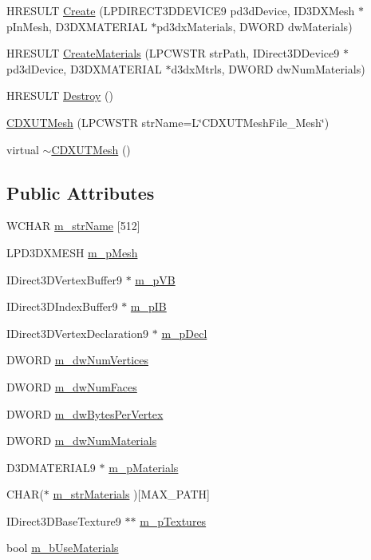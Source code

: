 \begin{DoxyCompactItemize}
\item 
HRESULT \hyperlink{class_c_d_x_u_t_mesh_ad7ffbc6b3d825dff6ca53ae0dbb2f6a1}{Create} (LPDIRECT3DDEVICE9 pd3dDevice, ID3DXMesh $\ast$pInMesh, D3DXMATERIAL $\ast$pd3dxMaterials, DWORD dwMaterials)
\item 
HRESULT \hyperlink{class_c_d_x_u_t_mesh_afe9dd1a0833b0d0b0df3fc0b72695e43}{CreateMaterials} (LPCWSTR strPath, IDirect3DDevice9 $\ast$pd3dDevice, D3DXMATERIAL $\ast$d3dxMtrls, DWORD dwNumMaterials)
\item 
HRESULT \hyperlink{class_c_d_x_u_t_mesh_ac19a8633a52a8075495c315e39c22c51}{Destroy} ()
\item 
\hyperlink{class_c_d_x_u_t_mesh_a4df4f33a650593f6e6898d21fa0d1a41}{CDXUTMesh} (LPCWSTR strName=L\char`\"{}CDXUTMeshFile\_\-Mesh\char`\"{})
\item 
virtual \hyperlink{class_c_d_x_u_t_mesh_abbf5790190a5b26f1ad7111884ef2cac}{$\sim$CDXUTMesh} ()
\end{DoxyCompactItemize}
\subsection*{Public Attributes}
\begin{DoxyCompactItemize}
\item 
WCHAR \hyperlink{class_c_d_x_u_t_mesh_a4b95b361c839f554ab58fc32595d1632}{m\_\-strName} \mbox{[}512\mbox{]}
\item 
LPD3DXMESH \hyperlink{class_c_d_x_u_t_mesh_af002b74bd049bb0bfd920332c0e04a98}{m\_\-pMesh}
\item 
IDirect3DVertexBuffer9 $\ast$ \hyperlink{class_c_d_x_u_t_mesh_adb848acc24af1a95863161a545eaa68e}{m\_\-pVB}
\item 
IDirect3DIndexBuffer9 $\ast$ \hyperlink{class_c_d_x_u_t_mesh_a588e11622970e060a5a8ce5359ae7429}{m\_\-pIB}
\item 
IDirect3DVertexDeclaration9 $\ast$ \hyperlink{class_c_d_x_u_t_mesh_af276ff015c17baade93c1f837a1a4c6e}{m\_\-pDecl}
\item 
DWORD \hyperlink{class_c_d_x_u_t_mesh_ad63cb9f8b37ad5f2d0b025814d316387}{m\_\-dwNumVertices}
\item 
DWORD \hyperlink{class_c_d_x_u_t_mesh_adfe36cbbc1e8e934423cacee8718d869}{m\_\-dwNumFaces}
\item 
DWORD \hyperlink{class_c_d_x_u_t_mesh_aad7b61edfcd1123bbc8ce2968c1e4e89}{m\_\-dwBytesPerVertex}
\item 
DWORD \hyperlink{class_c_d_x_u_t_mesh_a293ea66f6e3f20ebbcbbb694b1ec4abc}{m\_\-dwNumMaterials}
\item 
D3DMATERIAL9 $\ast$ \hyperlink{class_c_d_x_u_t_mesh_aa8a024428991c0c72f485982862a5a05}{m\_\-pMaterials}
\item 
CHAR($\ast$ \hyperlink{class_c_d_x_u_t_mesh_aeecb8deba496fe0213a2e5f5cd18f31d}{m\_\-strMaterials} )\mbox{[}MAX\_\-PATH\mbox{]}
\item 
IDirect3DBaseTexture9 $\ast$$\ast$ \hyperlink{class_c_d_x_u_t_mesh_a916868603f58f3d35c52a788f1a7075f}{m\_\-pTextures}
\item 
bool \hyperlink{class_c_d_x_u_t_mesh_a064834382ef044a6cb236f680e62fd7e}{m\_\-bUseMaterials}
\end{DoxyCompactItemize}


